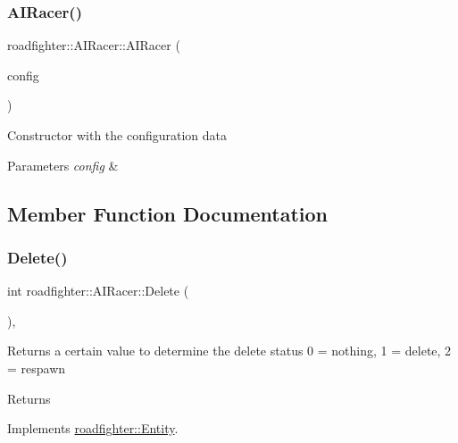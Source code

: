 \subsubsection{\texorpdfstring{A\+I\+Racer()}{AIRacer()}}
{\footnotesize\ttfamily roadfighter\+::\+A\+I\+Racer\+::\+A\+I\+Racer (\begin{DoxyParamCaption}\item[{std\+::shared\+\_\+ptr$<$ \hyperlink{classConfigData}{Config\+Data} $>$}]{config }\end{DoxyParamCaption})}

Constructor with the configuration data 
\begin{DoxyParams}{Parameters}
{\em config} & \\
\hline
\end{DoxyParams}


\subsection{Member Function Documentation}
\mbox{\label{classroadfighter_1_1AIRacer_af6fe47885c72aeddd02d13e136f4790f}} 
\subsubsection{\texorpdfstring{Delete()}{Delete()}}
{\footnotesize\ttfamily int roadfighter\+::\+A\+I\+Racer\+::\+Delete (\begin{DoxyParamCaption}{ }\end{DoxyParamCaption})\hspace{0.3cm}{\ttfamily [override]}, {\ttfamily [virtual]}}

Returns a certain value to determine the delete status 0 = nothing, 1 = delete, 2 = respawn \begin{DoxyReturn}{Returns}

\end{DoxyReturn}


Implements \hyperlink{classroadfighter_1_1Entity_a08190b0b8e6a3fcdb42273d6096152ac}{roadfighter\+::\+Entity}.

\mbox{\label{classroadfighter_1_1AIRacer_a74314c736ef3c26fb695a2bdf75bcd31}} 
